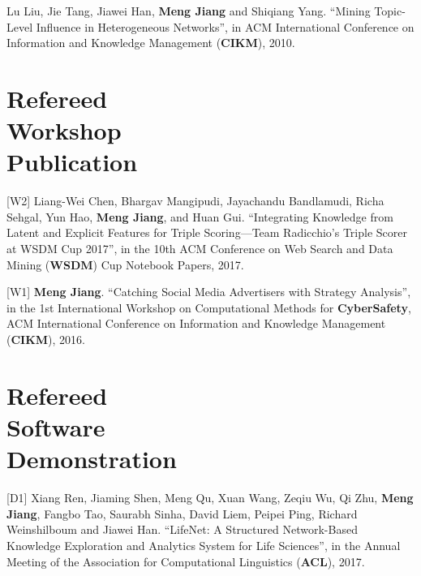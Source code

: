 \documentclass[margin, 9pt]{res}
\begin{document}
\begin{resume}
[C1] Lu Liu, Jie Tang, Jiawei Han, \textbf{Meng Jiang} and Shiqiang Yang. ``Mining Topic-Level Influence in Heterogeneous Networks'', in ACM International Conference on Information and Knowledge Management (\textbf{CIKM}), 2010.


\section{Refereed \\ Workshop \\ Publication}

[W2] Liang-Wei Chen, Bhargav Mangipudi, Jayachandu Bandlamudi, Richa Sehgal, Yun Hao, \textbf{Meng Jiang}, and Huan Gui. ``Integrating Knowledge from Latent and Explicit Features for Triple Scoring—Team Radicchio's Triple Scorer at WSDM Cup 2017'', in the 10th ACM Conference on Web Search and Data Mining (\textbf{WSDM}) Cup Notebook Papers, 2017.

[W1] \textbf{Meng Jiang}. ``Catching Social Media Advertisers with Strategy Analysis'', in the 1st International Workshop on Computational Methods for \textbf{CyberSafety}, ACM International Conference on Information and Knowledge Management (\textbf{CIKM}), 2016.


\section{Refereed \\ Software \\ Demonstration}

[D1] Xiang Ren, Jiaming Shen, Meng Qu, Xuan Wang, Zeqiu Wu, Qi Zhu, \textbf{Meng Jiang}, Fangbo Tao, Saurabh Sinha, David Liem, Peipei Ping, Richard Weinshilboum and Jiawei Han. ``LifeNet: A Structured Network-Based Knowledge Exploration and Analytics System for Life Sciences'', in the Annual Meeting of the Association for Computational Linguistics (\textbf{ACL}), 2017.



\end{resume}
\end{document}

